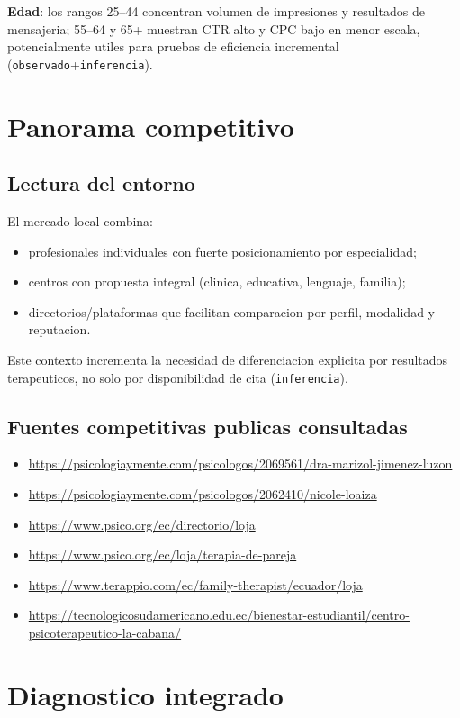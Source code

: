 \documentclass[9pt,a4paper,twocolumn,twoside]{tau-class/tau}
\begin{document}
\textbf{Edad}: los rangos 25--44 concentran volumen de impresiones y resultados de mensajeria; 55--64 y 65+ muestran CTR alto y CPC bajo en menor escala, potencialmente utiles para pruebas de eficiencia incremental (\texttt{observado}+\texttt{inferencia}).

\section{Panorama competitivo}

\subsection{Lectura del entorno}
El mercado local combina:
\begin{itemize}
  \item profesionales individuales con fuerte posicionamiento por especialidad;
  \item centros con propuesta integral (clinica, educativa, lenguaje, familia);
  \item directorios/plataformas que facilitan comparacion por perfil, modalidad y reputacion.
\end{itemize}

Este contexto incrementa la necesidad de diferenciacion explicita por resultados terapeuticos, no solo por disponibilidad de cita (\texttt{inferencia}).

\subsection{Fuentes competitivas publicas consultadas}
\begin{itemize}
  \item \url{https://psicologiaymente.com/psicologos/2069561/dra-marizol-jimenez-luzon}
  \item \url{https://psicologiaymente.com/psicologos/2062410/nicole-loaiza}
  \item \url{https://www.psico.org/ec/directorio/loja}
  \item \url{https://www.psico.org/ec/loja/terapia-de-pareja}
  \item \url{https://www.terappio.com/ec/family-therapist/ecuador/loja}
  \item \url{https://tecnologicosudamericano.edu.ec/bienestar-estudiantil/centro-psicoterapeutico-la-cabana/}
\end{itemize}

\section{Diagnostico integrado}
\end{document}
